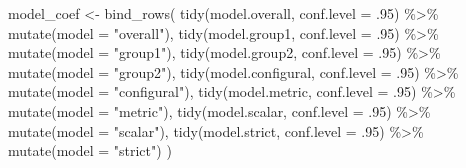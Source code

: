 \documentclass[
  man]{apa6}
\newenvironment{Shaded}{\begin{snugshade}}{\end{snugshade}}
\newcommand{\AttributeTok}[1]{\textcolor[rgb]{0.77,0.63,0.00}{#1}}
\newcommand{\DecValTok}[1]{\textcolor[rgb]{0.00,0.00,0.81}{#1}}
\newcommand{\FunctionTok}[1]{\textcolor[rgb]{0.00,0.00,0.00}{#1}}
\newcommand{\NormalTok}[1]{#1}
\newcommand{\OtherTok}[1]{\textcolor[rgb]{0.56,0.35,0.01}{#1}}
\newcommand{\SpecialCharTok}[1]{\textcolor[rgb]{0.00,0.00,0.00}{#1}}
\newcommand{\StringTok}[1]{\textcolor[rgb]{0.31,0.60,0.02}{#1}}
\begin{document}
\begin{Shaded}
\begin{Highlighting}[]
\NormalTok{  model\_coef }\OtherTok{\textless{}{-}} \FunctionTok{bind\_rows}\NormalTok{(}
    \FunctionTok{tidy}\NormalTok{(model.overall, }\AttributeTok{conf.level =}\NormalTok{ .}\DecValTok{95}\NormalTok{) }\SpecialCharTok{\%\textgreater{}\%} 
      \FunctionTok{mutate}\NormalTok{(}\AttributeTok{model =} \StringTok{"overall"}\NormalTok{), }
    \FunctionTok{tidy}\NormalTok{(model.group1, }\AttributeTok{conf.level =}\NormalTok{ .}\DecValTok{95}\NormalTok{) }\SpecialCharTok{\%\textgreater{}\%} 
      \FunctionTok{mutate}\NormalTok{(}\AttributeTok{model =} \StringTok{"group1"}\NormalTok{), }
    \FunctionTok{tidy}\NormalTok{(model.group2, }\AttributeTok{conf.level =}\NormalTok{ .}\DecValTok{95}\NormalTok{) }\SpecialCharTok{\%\textgreater{}\%} 
      \FunctionTok{mutate}\NormalTok{(}\AttributeTok{model =} \StringTok{"group2"}\NormalTok{), }
    \FunctionTok{tidy}\NormalTok{(model.configural, }\AttributeTok{conf.level =}\NormalTok{ .}\DecValTok{95}\NormalTok{) }\SpecialCharTok{\%\textgreater{}\%} 
      \FunctionTok{mutate}\NormalTok{(}\AttributeTok{model =} \StringTok{"configural"}\NormalTok{), }
    \FunctionTok{tidy}\NormalTok{(model.metric, }\AttributeTok{conf.level =}\NormalTok{ .}\DecValTok{95}\NormalTok{) }\SpecialCharTok{\%\textgreater{}\%} 
      \FunctionTok{mutate}\NormalTok{(}\AttributeTok{model =} \StringTok{"metric"}\NormalTok{), }
    \FunctionTok{tidy}\NormalTok{(model.scalar, }\AttributeTok{conf.level =}\NormalTok{ .}\DecValTok{95}\NormalTok{) }\SpecialCharTok{\%\textgreater{}\%} 
      \FunctionTok{mutate}\NormalTok{(}\AttributeTok{model =} \StringTok{"scalar"}\NormalTok{), }
    \FunctionTok{tidy}\NormalTok{(model.strict, }\AttributeTok{conf.level =}\NormalTok{ .}\DecValTok{95}\NormalTok{) }\SpecialCharTok{\%\textgreater{}\%} 
      \FunctionTok{mutate}\NormalTok{(}\AttributeTok{model =} \StringTok{"strict"}\NormalTok{)}
\NormalTok{  )}
    

\end{Highlighting}
\end{Shaded}
\end{document}
